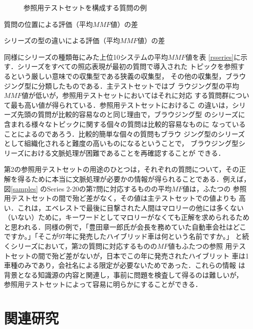 \documentclass[japanese]{jnlp_1.4}
\begin{document}
\begin{figure}[t]

\caption{参照用テストセットを構成する質問の例}
\label{refsamples}
\end{figure}
\begin{table}[t]
\caption{質問の位置による評価（平均$\mathit{MMF}$値）の差}
\label{rsmmf}

\end{table}
\begin{table}[t]
\caption{シリーズの型の違いによる評価（平均$\mathit{MMF}$値）の差}
\label{rsseries}

\end{table}


同様にシリーズの種類毎にみた上位10システムの平均$\mathit{MMF}$値を表
\ref{rsseries}に示す．シリーズをすべての照応表現が最初の質問で導入された
トピックを参照するという厳しい意味での収集型である狭義の収集型，
その他の収集型，ブラウジング型に分類したものである．主テストセットではブ
ラウジング型の平均$\mathit{MMF}$値が低いが，参照用テストセットにおいてはそれに対応
する質問群について最も高い値が得られている．参照用テストセットにおけるこ
の違いは，シリーズ先頭の質問が比較的容易なのと同じ理由で，ブラウジング型
のシリーズに含まれる様々なトピックに関する個々の質問は比較的容易なものに
なっていることによるのであろう．比較的簡単な個々の質問もブラウ
ジング型のシリーズとして組織化されると難度の高いものになるということで，
ブラウジング型シリーズにおける文脈処理が困難であることを再確認することが
できる．




第2の参照用テストセットの用途のひとつは，それぞれの質問について，その正
解を得るために本当に文脈処理が必要かの情報が得られることである．例えば，
図\ref{samples} のSeries 2-20の第7問に対応するものの平均$\mathit{MF}$値は，ふたつの
参照用テストセットの間で殆ど差がなく，その値は主テストセットでの値よりも
高い．これは，エベレストで最後に目撃された人間はマロリーの他には多くない
（いない）ために，キーワードとしてマロリーがなくても正解を求められるため
と思われる．同様の例で，「豊田章一郎氏が会長を務めていた自動車会社はどこ
ですか。」「そこが97年に発売したハイブリッド車は何という名前ですか。」
と続くシリーズにおいて，第2の質問に対応するものの$\mathit{MF}$値もふたつの参照
用テストセットの間で殆ど差がないが，日本でこの年に発売されたハイブリット
車は1車種のみであり，会社名による限定が必要ないためであった．これらの情報
は背景となる知識源の内容と関連し，事前に問題を検査して得るのは難しいが，
参照用テストセットによって容易に明らかにすることができる．



\section{関連研究} \label{Sec5}
\end{document}
